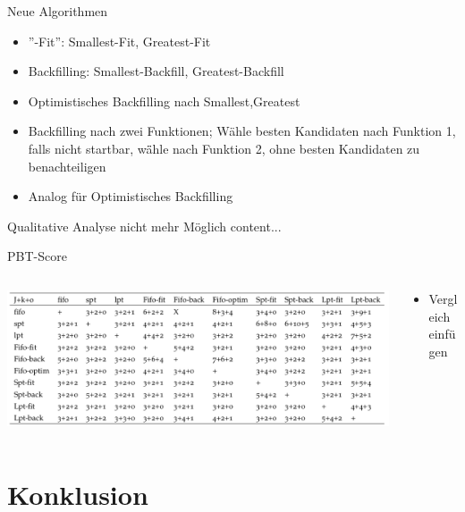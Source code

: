 \documentclass[aspectratio=169,10pt]{beamer}
\begin{document}
\begin{frame}[t, fragile]{Neue Algorithmen}
\begin{itemize}
	\item ''-Fit'': Smallest-Fit, Greatest-Fit
	\item Backfilling: Smallest-Backfill, Greatest-Backfill
	\item Optimistisches Backfilling nach Smallest,Greatest
	\item Backfilling nach zwei Funktionen; W\"ahle besten Kandidaten nach Funktion 1, falls nicht startbar, w\"ähle nach Funktion 2, ohne besten Kandidaten zu benachteiligen
	\item Analog für Optimistisches Backfilling
\end{itemize}
\end{frame}

\begin{frame}[t,fragile]{Qualitative Analyse nicht mehr M\"oglich}
	content...
\end{frame}

\begin{frame}[fragile]{PBT-Score}

\begin{columns}
	\begin{column}{0.57\paperwidth}
		\vspace{0.5pt}
		\includegraphics[width=\linewidth, clip]{images/SchedulerX.png}
	\end{column}
	\begin{column}[c]{0.43\paperwidth}
		\begin{itemize}
			\item Vergleich einfügen
		\end{itemize}
	\end{column}
\end{columns}
\end{frame}

\section{Konklusion}

\end{document}
